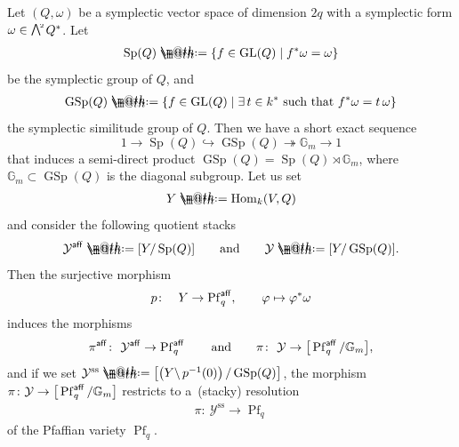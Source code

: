 \documentclass[pdftex]{sigma}%
\makeatletter
\newcommand*{\defeq}{\mathrel{\rlap{%
 \raisebox{0.3ex}{$\m@th\cdot$}}%
 \raisebox{-0.3ex}{$\m@th\cdot$}}%
 =}
\numberwithin{equation}{section}
\newcommand{\Hom}{\operatorname{Hom}}
\newcommand{\Pf}{\operatorname{Pf}}
\newcommand{\Sp}{\operatorname{Sp}}
\newcommand{\GL}{\operatorname{GL}}
\newcommand{\GSp}{\operatorname{GSp}}
\newcommand{\aff}{\operatorname{\sf aff}}
\newcommand{\stab}{\operatorname{ss}}
\newcommand{\cY}{\mathcal{Y}}
\newcommand{\bG}{\mathbb{G}}
\newcommand{\hookto}{\hookrightarrow}
\newcommand{\surjto}{\twoheadrightarrow}
\newcommand{\gwedge}{\raisebox{1pt}[0pt][0pt]{$\textstyle \bigwedge^{\raisebox{-1pt}[0pt][0pt]{\tiny\!$2$\,}}$}}
\makeatother
\begin{document}
 Let $(Q,\omega)$ be a symplectic vector space of dimension $2q$ with a symplectic form $\omega\in \gwedge Q^{\ast}$. Let
\begin{gather*}
\Sp(Q)\defeq\{f\in \GL(Q)\mid f^*\omega=\omega\}
\end{gather*}
be the symplectic group of $Q$, and
\begin{gather*}
\GSp(Q)\defeq\{f\in \GL(Q)\mid \exists\, t\in k^*\mbox{ such that } f^*\omega=t\, \omega\}
\end{gather*}
the symplectic similitude group of $Q$.
Then we have a short exact sequence
\begin{equation}\label{ses}
1\to\Sp(Q)\hookto \GSp(Q)\surjto \bG_m\to1
\end{equation}
that induces a semi-direct product $\GSp(Q)= \Sp(Q)\rtimes\bG_m$, where $\bG_m\subset \GSp(Q)$ is the diagonal subgroup. Let us set
\begin{gather*}
Y\defeq\Hom_k(V,Q)
\end{gather*}
and consider the following quotient stacks
\begin{gather*}
\cY^{\aff}\defeq[Y/\Sp(Q)]
\qquad\text{and}\qquad
\cY\defeq[Y/\GSp(Q)].
\end{gather*}
Then the surjective morphism
\begin{gather*}
p\colon\quad Y\to \Pf_q^{\aff}, \qquad \varphi\mapsto \varphi^*\omega
\end{gather*}
induces the morphisms
\begin{gather*}
\pi^{\aff}\colon\ \cY^{\aff}\to \Pf_q^{\aff}
\qquad\text{and}\qquad
\pi\colon\ \cY\to \big[\Pf_q^{\aff}/\bG_m\big],
\end{gather*}
and if we set $\cY^{\stab}\defeq\left[\left(Y\backslash \,p^{-1}(0)\right)/\GSp(Q)\right]$, the morphism $\pi\colon \cY\to \big[\Pf_q^{\aff}/\bG_m\big]$ restricts to a~(stacky) resolution
\begin{gather*}
\pi\colon\ \cY^{\stab}\to \Pf_q
\end{gather*}
of the Pfaffian variety $\Pf_q$.
\end{document}
